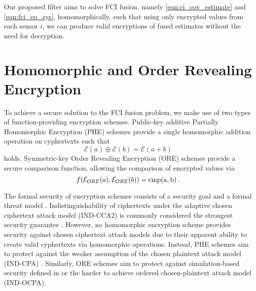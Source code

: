 \documentclass[letterpaper, 10 pt, conference]{ieeeconf}  %
\begin{document}
Our proposed filter aims to solve FCI fusion, namely \eqref{eqn:ci_cov_estimate} and \eqref{eqn:fci_eq_sys}, homomorphically, such that using only encrypted values from each sensor $i$, we can produce valid encryptions of fused estimates without the need for decryption.




\section{Homomorphic and Order Revealing Encryption} \label{sec:encryption}
To achieve a secure solution to the FCI fusion problem, we make use of two types of function-providing encryption schemes. Public-key additive Partially Homomorphic Encryption (PHE) schemes \cite{paillierPublicKeyCryptosystemsBased1999,goldwasserProbabilisticEncryption1984} provide a single homomorphic addition operation on cyphertexts such that
\begin{equation}
   \mathcal{E}(a) \oplus \mathcal{E}(b) = \mathcal{E}(a+b) \label{eqn:phe_eq}
\end{equation}
holds. Symmetric-key Order Revealing Encryption (ORE) schemes \cite{chenettePracticalOrderRevealingEncryption2016,lewiOrderRevealingEncryptionNew2016} provide a secure comparison function, allowing the comparison of encrypted values via
\begin{equation}
   f(\mathcal{E}_{ORE}(a), \mathcal{E}_{ORE}(b)) = \operatorfont{cmp}(a, b)\,. \label{eqn:ore_eq}
\end{equation}

The formal security of encryption schemes consists of a security goal and a formal threat model \cite{katzIntroductionModernCryptography2008}. Indistinguishability of ciphertexts under the adaptive chosen ciphertext attack model (IND-CCA2) is commonly considered the strongest security guarantee \cite{bellareRelationsNotionsSecurity1998}. However, no homomorphic encryption scheme provides security against chosen ciphertext attack models due to their apparent ability to create valid cyphertexts via homomorphic operations. Instead, PHE schemes aim to protect against the weaker assumption of the chosen plaintext attack model (IND-CPA) \cite{chaseSecurityHomomorphicEncryption2017}. Similarly, ORE schemes aim to protect against simulation-based security defined in \cite{chenettePracticalOrderRevealingEncryption2016} or the harder to achieve ordered chosen-plaintext attack model (IND-OCPA).
\end{document}
